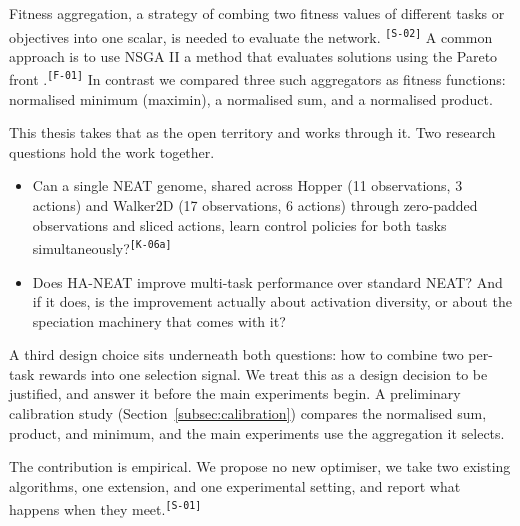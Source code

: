 \documentclass[12pt]{article}
\newcommand{\revID}[1]{\textsuperscript{\scriptsize\texttt{[#1]}}}
\newcommand{\revStyle}[2]{\textcolor{revViolet}{#2}\revID{#1}}
\newcommand{\revFlow}[2]{\textcolor{revPurple}{#2}\revID{#1}}
\newcommand{\revConsistency}[2]{\textcolor{revBlue}{#2}\revID{#1}}
\begin{document}
\revStyle{S-02}{Fitness aggregation, a strategy of combing two fitness values of different tasks or objectives into one scalar, is needed to evaluate the network. }
\revFlow{F-01}{A common approach is to use NSGA II a method that evaluates solutions using the Pareto front \parencite{deb_fast_2002}.}
In contrast we compared three such aggregators as fitness functions:  normalised minimum (maximin), a normalised sum, and a normalised product.



This thesis takes that as the open territory and works through it.
Two research questions hold the work together.
\begin{itemize}
    \item \revConsistency{K-06a}{Can a single NEAT genome, shared across Hopper (11 observations, 3 actions) and Walker2D (17 observations, 6 actions) through zero-padded observations and sliced actions, learn control policies for both tasks simultaneously?}
    \item Does HA-NEAT improve multi-task performance over standard NEAT? And if it does, is the improvement actually about activation diversity, or about the speciation machinery that comes with it?
\end{itemize}
A third design choice sits underneath both questions: how to combine two per-task rewards into one selection signal.
We treat this as a design decision to be justified, and answer it before the main experiments begin.
A preliminary calibration study (Section~\ref{subsec:calibration}) compares the normalised sum, product, and minimum, and the main experiments use the aggregation it selects.

The contribution is empirical.
\revStyle{S-01}{We propose no new optimiser, we take two existing algorithms, one extension, and one experimental setting, and report what happens when they meet.}
\end{document}
